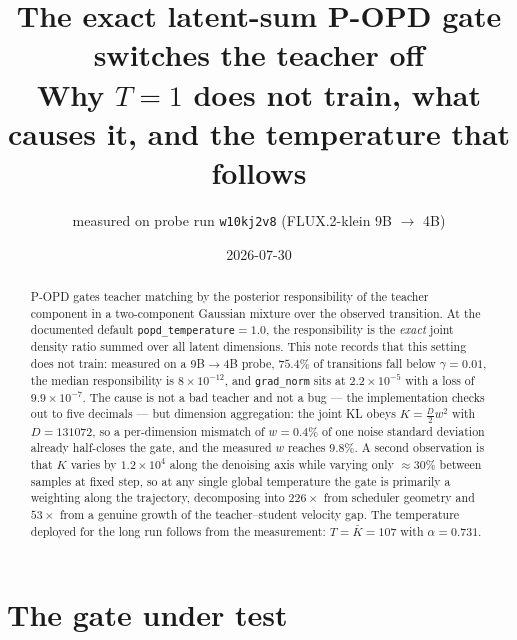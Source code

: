 \documentclass[11pt,a4paper]{article}
\title{\textbf{The exact latent-sum P-OPD gate switches the teacher off}\\[0.3em]
\large Why $T=1$ does not train, what causes it, and the temperature that follows}
\author{measured on probe run \texttt{w10kj2v8} (FLUX.2-klein 9B $\to$ 4B)}
\date{2026-07-30}
\begin{document}
\maketitle

\begin{abstract}
P-OPD gates teacher matching by the posterior responsibility of the teacher component in a
two-component Gaussian mixture over the observed transition. At the documented default
\texttt{popd\_temperature}$=1.0$, the responsibility is the \emph{exact} joint density ratio
summed over all latent dimensions. This note records that this setting does not train: measured
on a 9B$\to$4B probe, $75.4\%$ of transitions fall below $\gamma=0.01$, the median responsibility
is $8\times10^{-12}$, and \texttt{grad\_norm} sits at $2.2\times10^{-5}$ with a loss of
$9.9\times10^{-7}$. The cause is not a bad teacher and not a bug --- the implementation checks
out to five decimals --- but dimension aggregation: the joint KL obeys
$K=\tfrac{D}{2}w^2$ with $D=131072$, so a per-dimension mismatch of $w=0.4\%$ of one noise
standard deviation already half-closes the gate, and the measured $w$ reaches $9.8\%$. A second
observation is that $K$ varies by $1.2\times10^{4}$ along the denoising axis while varying only
$\approx\!30\%$ between samples at fixed step, so at any single global temperature the gate is
primarily a weighting along the trajectory, decomposing into $226\times$ from scheduler geometry
and $53\times$ from a genuine growth of the teacher--student velocity gap. The temperature
deployed for the long run follows from the measurement: $T=\bar{K}=107$ with $\alpha=0.731$.
\end{abstract}

\tableofcontents

\section{The gate under test}
\label{sec:setup}
\end{document}
